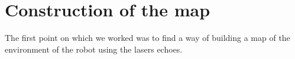 \section{Construction of the map}

The first point on which we worked was to find a way of building a map of the environment of the robot using the lasers echoes.


